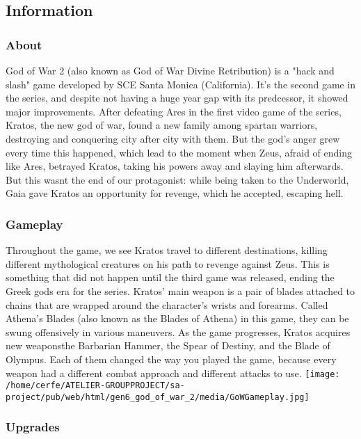 \documentclass[a4paper,10pt]{book}
\begin{document}
 \subsection{Information }
 \subsubsection{About }
 
          God of War 2 (also known as God of War Divine Retribution) is a "hack and slash" game developed by SCE Santa Monica (California). It's the second game in the series, and despite not having a huge year gap with its predcessor, it showed major improvements.    
          After defeating Ares in the first video game of the series, Kratos, the new god of war, found a new family among spartan warriors, destroying and conquering city after city with them. But the god's anger grew every time this happened, which lead to the moment when Zeus, afraid of ending like Ares, betrayed Kratos, taking his powers away and slaying him afterwards. But this wasnt the end of our protagonist: while being taken to the Underworld, Gaia gave Kratos an opportunity for revenge, which he accepted, escaping hell.
           
 \subsubsection{Gameplay }
 
          Throughout the game, we see Kratos travel to different destinations, killing different mythological creatures on his path to revenge against Zeus. This is something that did not happen until the third game was released, ending the Greek gods era for the series.
 Kratos' main weapon is a pair of blades attached to chains that are wrapped around the character's wrists and forearms. Called Athena's Blades (also known as the Blades of Athena) in this game, they can be swung offensively in various maneuvers. As the game progresses, Kratos acquires new weaponsthe Barbarian Hammer, the Spear of Destiny, and the Blade of Olympus. Each of them changed the way you played the game, because every weapon had a different combat approach and different attacks to use.
  \texttt{[image: /home/cerfe/ATELIER-GROUPPROJECT/sa-project/pub/web/html/gen6\_god\_of\_war\_2/media/GoWGameplay.jpg]}
 
 
 \subsubsection{Upgrades }
\end{document}
